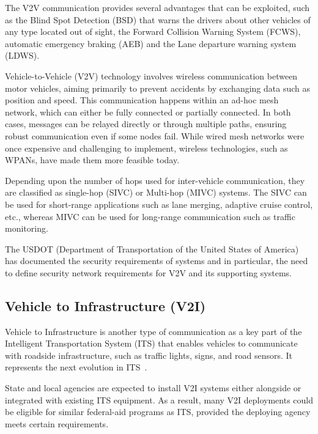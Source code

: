 The V2V communication provides several advantages that can be exploited, such as the Blind Spot Detection (BSD) that warns the drivers about other vehicles of any type located out of sight,
the Forward Collision Warning System (FCWS), automatic emergency braking (AEB) and the Lane departure warning system (LDWS)\cite{arena2019overview}.

Vehicle-to-Vehicle (V2V) technology involves wireless communication between motor vehicles, aiming primarily to prevent accidents by exchanging data such as position and speed.
This communication happens within an ad-hoc mesh network, which can either be fully connected or partially connected.
In both cases, messages can be relayed directly or through multiple paths, ensuring robust communication even if some nodes fail.
While wired mesh networks were once expensive and challenging to implement, wireless technologies, such as WPANs, have made them more feasible today\cite{arena2019overview}.

Depending upon the number of hops used for inter-vehicle communication, they are classified as single-hop (SIVC) or
Multi-hop (MIVC) systems.
The SIVC can be used for short-range applications such as
lane merging, adaptive cruise control, etc., whereas MIVC can be used for long-range communication such as traffic monitoring\cite{zheng2020cooperative}.

The USDOT (Department of Transportation of the United States of America) has documented the security requirements of
systems and in particular, the need to define security network requirements for V2V and its supporting systems.

\subsection{Vehicle to Infrastructure (V2I)}\label{subsec:vehicle-to-infrastructure-(v2i)}
Vehicle to Infrastructure is another type of communication as a key part of the Intelligent Transportation System (ITS)
that enables vehicles to communicate with roadside infrastructure, such as traffic lights, signs, and road sensors.
It represents the next evolution in ITS~\cite{dot2024v2i}.

State and local agencies are expected to install V2I systems either alongside or integrated with existing ITS equipment.
As a result, many V2I deployments could be eligible for similar federal-aid programs as ITS,
provided the deploying agency meets certain requirements\cite{dot2024v2i}.

